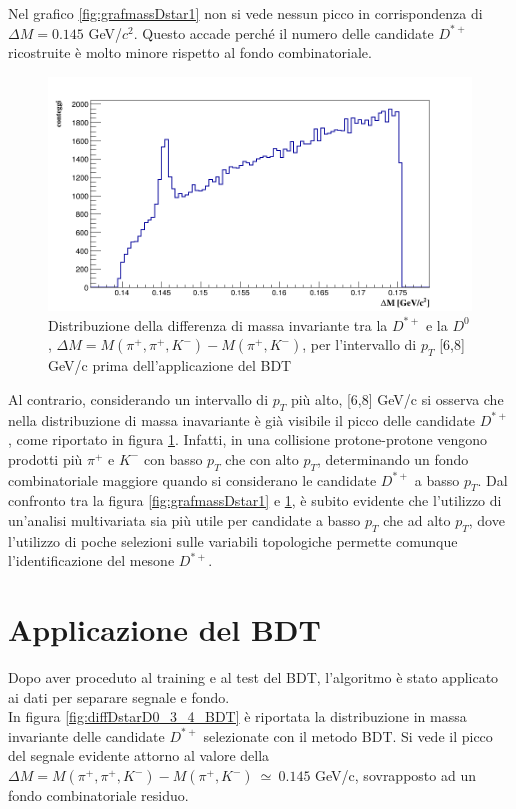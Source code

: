Nel grafico \ref{fig:grafmassDstar1} non si vede nessun picco in corrispondenza di $\Delta M = 0.145$ GeV/$c^2$. Questo accade perché il numero delle candidate $D^{*+}$ ricostruite è molto minore rispetto al fondo combinatoriale.
    \begin{figure}[htbp]
        \centering
        \includegraphics[width=0.7\linewidth]{AnalisiDati/dati_6_8.png}
        \caption{Distribuzione della differenza di massa invariante tra la $D^{*+}$ e la $D^0$, $\Delta M = M(\pi^+,\pi^+,K^-) - M(\pi^+,K^-)$, per l'intervallo di $p_T$ [6,8] GeV/c prima dell'applicazione del BDT}
        \label{fig:grafmassDstar2}
    \end{figure}
Al contrario, considerando un intervallo di $p_T$ pi\`u alto, [6,8] GeV/c si osserva che nella distribuzione di massa inavariante \`e gi\`a visibile il picco delle candidate $D^{*+}$, come riportato in figura \ref{fig:grafmassDstar2}. Infatti, in una collisione protone-protone vengono prodotti pi\`u $\pi^+$ e $K^-$ con basso $p_T$ che con alto $p_T$, determinando un fondo combinatoriale maggiore quando si considerano le candidate $D^{*+}$ a basso $p_T$. Dal confronto tra la figura \ref{fig:grafmassDstar1} e \ref{fig:grafmassDstar2}, \`e subito evidente che l'utilizzo di un'analisi multivariata sia pi\`u utile per candidate a basso $p_T$ che ad alto $p_T$, dove l'utilizzo di poche selezioni sulle variabili topologiche permette comunque l'identificazione del mesone $D^{*+}$.

\section{Applicazione del BDT} \label{applicazione}
Dopo aver proceduto al training e al test del BDT, l'algoritmo \`e stato applicato ai dati per separare segnale e fondo.
\\In figura \ref{fig:diffDstarD0_3_4_BDT} è riportata la distribuzione in massa invariante delle candidate $D^{*+}$ selezionate con il metodo BDT. Si vede il picco del segnale evidente attorno al valore della $ \Delta M = M(\pi^+,\pi^+,K^-) - M(\pi^+,K^-) \ \simeq \ 0.145$ GeV/c, sovrapposto ad un fondo combinatoriale residuo.

